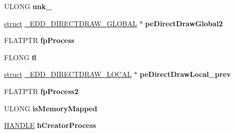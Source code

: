 \begin{DoxyCompactItemize}
U\+L\+O\+NG {\bfseries unk\+\_}
\item 
\mbox{\label{struct___e_d_d___d_i_r_e_c_t_d_r_a_w___l_o_c_a_l_a292d2e0c52808a2f67774427b2eb6099}} 
\hyperlink{interfacestruct}{struct} \hyperlink{struct___e_d_d___d_i_r_e_c_t_d_r_a_w___g_l_o_b_a_l}{\+\_\+\+E\+D\+D\+\_\+\+D\+I\+R\+E\+C\+T\+D\+R\+A\+W\+\_\+\+G\+L\+O\+B\+AL} $\ast$ {\bfseries pe\+Direct\+Draw\+Global2}
\item 
\mbox{\label{struct___e_d_d___d_i_r_e_c_t_d_r_a_w___l_o_c_a_l_a06288258afa5f39cdf25dff9a585bf9b}} 
F\+L\+A\+T\+P\+TR {\bfseries fp\+Process}
\item 
\mbox{\label{struct___e_d_d___d_i_r_e_c_t_d_r_a_w___l_o_c_a_l_a36c7210a6c8396316d4bcbd0d26812a2}} 
F\+L\+O\+NG {\bfseries fl}
\item 
\mbox{\label{struct___e_d_d___d_i_r_e_c_t_d_r_a_w___l_o_c_a_l_a8e6edfefbcb4edf82c48b21b1c027422}} 
\hyperlink{interfacestruct}{struct} \hyperlink{struct___e_d_d___d_i_r_e_c_t_d_r_a_w___l_o_c_a_l}{\+\_\+\+E\+D\+D\+\_\+\+D\+I\+R\+E\+C\+T\+D\+R\+A\+W\+\_\+\+L\+O\+C\+AL} $\ast$ {\bfseries pe\+Direct\+Draw\+Local\+\_\+prev}
\item 
\mbox{\label{struct___e_d_d___d_i_r_e_c_t_d_r_a_w___l_o_c_a_l_ad0b4480ffe0d2d05f37040eedb685f03}} 
F\+L\+A\+T\+P\+TR {\bfseries fp\+Process2}
\item 
\mbox{\label{struct___e_d_d___d_i_r_e_c_t_d_r_a_w___l_o_c_a_l_ae65845dcdc7e3461bcf5741ead5e6d66}} 
U\+L\+O\+NG {\bfseries is\+Memory\+Mapped}
\item 
\mbox{\label{struct___e_d_d___d_i_r_e_c_t_d_r_a_w___l_o_c_a_l_a603ac5f53285f9b367c45e0b06c26cb4}} 
\hyperlink{interfacevoid}{H\+A\+N\+D\+LE} {\bfseries h\+Creator\+Process}
\item 
\mbox{\label{struct___e_d_d___d_i_r_e_c_t_d_r_a_w___l_o_c_a_l_a19cb30b1cd1b439ce24f68fa20bc3a93}} 

\end{DoxyCompactItemize}
